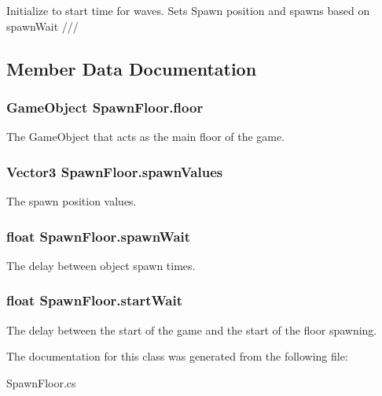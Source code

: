 Initialize to start time for waves. Sets Spawn position and spawns based on spawn\-Wait /// 



\subsection{Member Data Documentation}
\hypertarget{classSpawnFloor_a5c0ce5e6b89553960340b1a108ef49d6}{
\subsubsection[{floor}]{\setlength{\rightskip}{0pt plus 5cm}Game\-Object Spawn\-Floor.\-floor}}\label{classSpawnFloor_a5c0ce5e6b89553960340b1a108ef49d6}


The Game\-Object that acts as the main floor of the game. 

\hypertarget{classSpawnFloor_ade77f9840ef3b18a4f2fb12ef8f16b61}{
\subsubsection[{spawn\-Values}]{\setlength{\rightskip}{0pt plus 5cm}Vector3 Spawn\-Floor.\-spawn\-Values}}\label{classSpawnFloor_ade77f9840ef3b18a4f2fb12ef8f16b61}


The spawn position values. 

\hypertarget{classSpawnFloor_abbc700e5d578b3317400424919914a71}{
\subsubsection[{spawn\-Wait}]{\setlength{\rightskip}{0pt plus 5cm}float Spawn\-Floor.\-spawn\-Wait}}\label{classSpawnFloor_abbc700e5d578b3317400424919914a71}


The delay between object spawn times. 

\hypertarget{classSpawnFloor_a3ed022cb29f19385586cbb4eccfca523}{
\subsubsection[{start\-Wait}]{\setlength{\rightskip}{0pt plus 5cm}float Spawn\-Floor.\-start\-Wait}}\label{classSpawnFloor_a3ed022cb29f19385586cbb4eccfca523}


The delay between the start of the game and the start of the floor spawning. 



The documentation for this class was generated from the following file\-:\begin{DoxyCompactItemize}
\item 
Spawn\-Floor.\-cs\end{DoxyCompactItemize}
